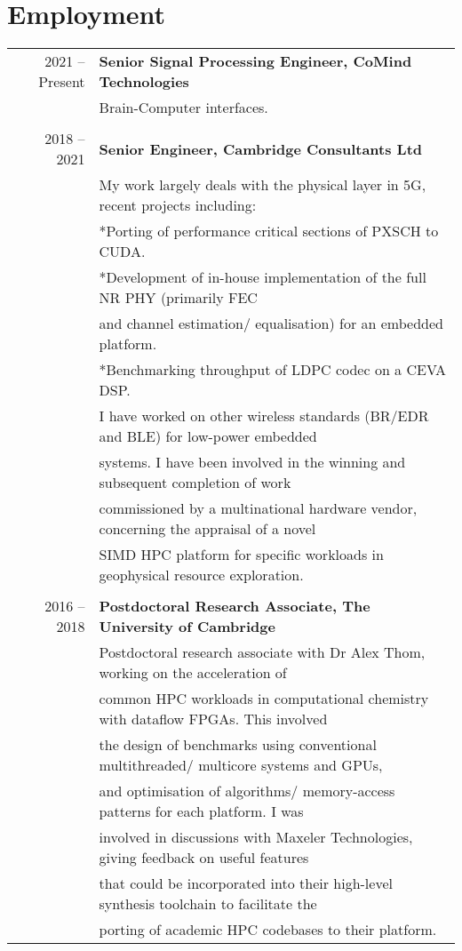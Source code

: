 \documentclass[11pt]{article} %
\begin{document}
\section{Employment}
\begin{tabular}{rl}
2021 -- Present & \textbf{Senior Signal Processing Engineer, CoMind Technologies}\\
&Brain-Computer interfaces.\\
&\\
2018 -- 2021 & \textbf{Senior Engineer, Cambridge Consultants Ltd}\\
&My work largely deals with the physical layer in 5G, recent projects including:\\
&\hspace{5mm}*\hspace{3mm}Porting of performance critical sections of PXSCH to CUDA.\\
&\hspace{5mm}*\hspace{3mm}Development of in-house implementation of the full NR PHY (primarily FEC\\
&\hspace{5mm}\hphantom{*}\hspace{3mm}and channel estimation/ equalisation) for an embedded platform.\\
&\hspace{5mm}*\hspace{3mm}Benchmarking throughput of LDPC codec on a CEVA DSP.\\
&I have worked on other wireless standards (BR/EDR and BLE) for low-power embedded\\ 
&systems. I have been involved in the winning and subsequent completion of work\\ 
&commissioned by a multinational hardware vendor, concerning the appraisal of a novel\\ 
&SIMD HPC platform for specific workloads in geophysical resource exploration.\\
&\\
2016 -- 2018 & \textbf{Postdoctoral Research Associate, The University of Cambridge}\\
& Postdoctoral research associate with Dr Alex Thom, working on the acceleration of\\ 
&common HPC workloads in computational chemistry with dataflow FPGAs. This involved\\ 
&the design of benchmarks using conventional multithreaded/ multicore systems and GPUs,\\ 
&and optimisation of algorithms/ memory-access patterns for each platform. I was\\ 
&involved in discussions with Maxeler Technologies, giving feedback on useful features\\ 
&that could be incorporated into their high-level synthesis toolchain to facilitate the\\ 
&porting of academic HPC codebases to their platform.\\
\end{tabular}
\\
\end{document}
